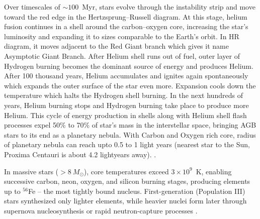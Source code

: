 Over timescales of $\sim 100$~Myr, stars evolve through the instability strip and move toward the red edge in the Hertzsprung–Russell diagram. At this stage, helium fusion continues in a shell around the carbon–oxygen core, increasing the star's luminosity and expanding it to sizes comparable to the Earth’s orbit. In HR diagram, it moves adjacent to the Red Giant branch which gives it name Asymptotic Giant Branch. After Helium shell runs out of fuel, outer layer of Hydrogen burning becomes the dominant source of energy and produces Helium. After 100 thousand years, Helium accumulates and ignites again spontaneously which expands the outer surface of the star even more. Expansion cools down the temperature which halts the Hydrogen shell burning. In the next hundreds of years, Helium burning stops and Hydrogen burning take place to produce more Helium. This cycle of energy production in shells along with Helium shell flash processes expel 50\% to 70\% of star's mass in the interstellar space, bringing AGB stars to its end as a planetary nebula. With Carbon and Oxygen rich core, radius of planetary nebula can reach upto 0.5 to 1 light years (nearest star to the Sun, Proxima Centauri is about 4.2 lightyears away).  \citep{CarrollOstlie2017}.  





%

In massive stars ($>8~M_\odot$), core temperatures exceed $3\times 10^9$~K, enabling successive carbon, neon, oxygen, and silicon burning stages, producing elements up to $^{56}$Fe -- the most tightly bound nucleus. First-generation (Population III) stars synthesized only lighter elements, while heavier nuclei form later through supernova nucleosynthesis or rapid neutron-capture processes \citep{WoosleyWeaver1995}.

%



